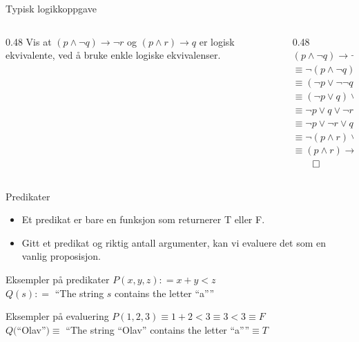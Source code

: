 \begin{frame}{Typisk logikkoppgave}
    \begin{columns}
    \begin{column}{0.48\textwidth}
        Vis at $(p \land \lnot q) \rightarrow \lnot r$ og $(p \land r) \rightarrow q$ er logisk ekvivalente, ved å bruke enkle logiske ekvivalenser.\\[1cm]
    \end{column}
    \begin{column}{0.48\textwidth}
            \pause
            $(p \land \lnot q) \rightarrow \lnot r$ \\
            \pause
            $\equiv \lnot (p \land \lnot q) \lor \lnot r$ \\
            \pause
            $\equiv (\lnot p \lor \lnot \lnot q) \lor \lnot r$ \\
            \pause
            $\equiv (\lnot p \lor q) \lor \lnot r$ \\
            \pause
            $\equiv \lnot p \lor q \lor \lnot r$ \\
            \pause
            $\equiv \lnot p \lor \lnot r \lor q$ \\
            \pause
            $\equiv \lnot (p \land r) \lor q$ \\
            \pause
            $\equiv (p \land r) \rightarrow q$
            $\qed$
    \end{column}
    \end{columns}
\end{frame}

\begin{frame}{Predikater}
    \begin{itemize}
        \item Et predikat er bare en funksjon som returnerer T eller F.
        \item Gitt et predikat og riktig antall argumenter, kan vi evaluere det som en vanlig proposisjon.
    \end{itemize}
    \begin{block}{Eksempler på predikater}
        $P(x, y, z) : =  x + y < z$\\
        $Q(s) : = $ ``The string $s$ contains the letter \enquote{a}''
    \end{block}
    \pause
    \begin{block}{Eksempler på evaluering}
        $P(1, 2, 3) \equiv 1 + 2 < 3 \equiv 3 < 3 \equiv F$ \\ 
        $Q($\enquote{Olav}$) \equiv $ ``The string \enquote{Olav} contains the letter \enquote{a}''$ \equiv T$
    \end{block}

\end{frame}